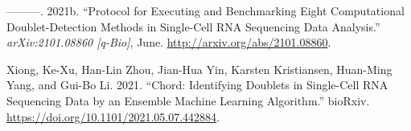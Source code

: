 \documentclass[10pt,a4paper,twocolumn]{article}
\begin{document}
\begin{CSLReferences}{1}{0}
\leavevmode\hypertarget{ref-xiProtocolExecutingBenchmarking2021}{}%
---------. 2021b. {``Protocol for Executing and Benchmarking Eight Computational Doublet-Detection Methods in Single-Cell RNA Sequencing Data Analysis.''} \emph{arXiv:2101.08860 {[}q-Bio{]}}, June. \url{http://arxiv.org/abs/2101.08860}.

\leavevmode\hypertarget{ref-xiongChordIdentifyingDoublets2021}{}%
Xiong, Ke-Xu, Han-Lin Zhou, Jian-Hua Yin, Karsten Kristiansen, Huan-Ming Yang, and Gui-Bo Li. 2021. {``Chord: Identifying Doublets in Single-Cell RNA Sequencing Data by an Ensemble Machine Learning Algorithm.''} bioRxiv. \url{https://doi.org/10.1101/2021.05.07.442884}.

\end{CSLReferences}









\end{document}
